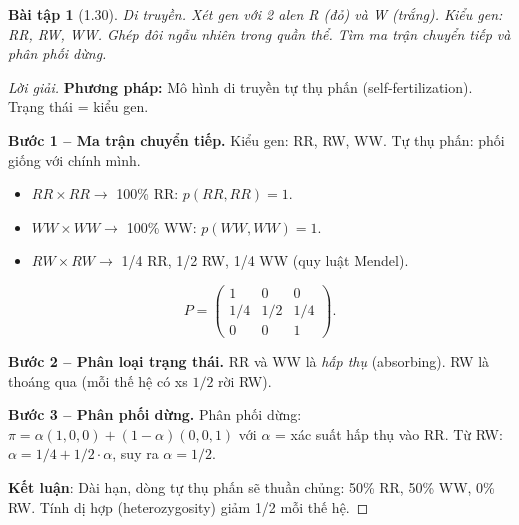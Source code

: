 \documentclass[8pt,a4paper]{article}
\newtheorem{exercise}{Bài tập}
\newenvironment{solution}{\begin{proof}[Lời giải]}{\end{proof}}
\begin{document}
\begin{exercise}[1.30]
Di truyền. Xét gen với 2 alen R (đỏ) và W (trắng). Kiểu gen: RR, RW, WW. Ghép đôi ngẫu nhiên trong quần thể. Tìm ma trận chuyển tiếp và phân phối dừng.
\end{exercise}
\begin{solution}
\textbf{Phương pháp:} Mô hình di truyền tự thụ phấn (self-fertilization). Trạng thái = kiểu gen.

\textbf{Bước 1 -- Ma trận chuyển tiếp.}
Kiểu gen: RR, RW, WW. Tự thụ phấn: phối giống với chính mình.
\begin{itemize}
  \item $RR \times RR \to$ 100\% RR: $p(RR, RR) = 1$.
  \item $WW \times WW \to$ 100\% WW: $p(WW, WW) = 1$.
  \item $RW \times RW \to$ 1/4 RR, 1/2 RW, 1/4 WW (quy luật Mendel).
\end{itemize}
\[
  P = \begin{pmatrix} 1 & 0 & 0 \\ 1/4 & 1/2 & 1/4 \\ 0 & 0 & 1 \end{pmatrix}.
\]

\textbf{Bước 2 -- Phân loại trạng thái.}
RR và WW là \emph{hấp thụ} (absorbing). RW là thoáng qua (mỗi thế hệ có xs $1/2$ rời RW).

\textbf{Bước 3 -- Phân phối dừng.}
Phân phối dừng: $\pi = \alpha(1,0,0) + (1-\alpha)(0,0,1)$ với $\alpha$ = xác suất hấp thụ vào RR. Từ RW: $\alpha = 1/4 + 1/2 \cdot \alpha$, suy ra $\alpha = 1/2$.

\textbf{Kết luận}: Dài hạn, dòng tự thụ phấn sẽ thuần chủng: 50\% RR, 50\% WW, 0\% RW. Tính dị hợp (heterozygosity) giảm 1/2 mỗi thế hệ.
\end{solution}
\end{document}
